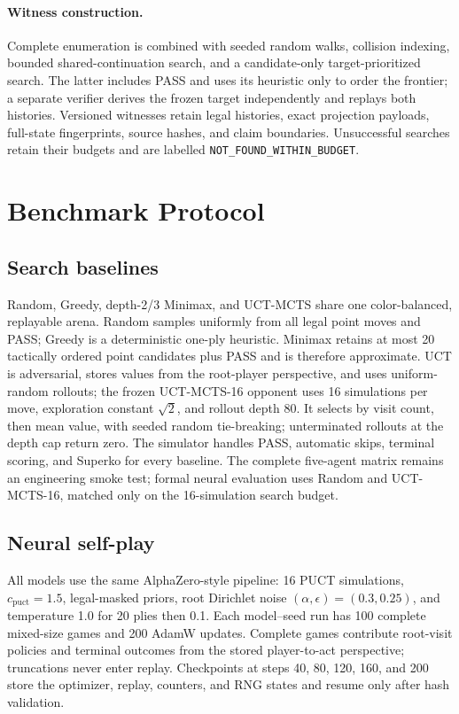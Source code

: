 \documentclass{article}
\begin{document}
\paragraph{Witness construction.}
Complete enumeration is combined with seeded random walks, collision indexing,
bounded shared-continuation search, and a candidate-only target-prioritized
search. The latter includes PASS and uses its heuristic only to order the
frontier; a separate verifier derives the frozen target independently and
replays both histories. Versioned witnesses retain legal histories, exact
projection payloads, full-state fingerprints, source hashes, and claim
boundaries. Unsuccessful searches retain their budgets and are labelled
\texttt{NOT\_FOUND\_WITHIN\_BUDGET}.

\section{Benchmark Protocol}
\label{sec:protocol}

\subsection{Search baselines}

Random, Greedy, depth-2/3 Minimax, and UCT-MCTS share one color-balanced,
replayable arena. Random samples uniformly from all legal point moves and PASS;
Greedy is a deterministic one-ply heuristic. Minimax retains at most 20
tactically ordered point candidates plus PASS and is therefore approximate.
UCT is adversarial, stores values from the root-player perspective, and uses
uniform-random rollouts; the frozen UCT-MCTS-16 opponent uses 16 simulations
per move, exploration constant $\sqrt{2}$, and rollout depth 80. It selects by
visit count, then mean value, with seeded random tie-breaking; unterminated
rollouts at the depth cap return zero. The simulator handles PASS, automatic
skips, terminal scoring, and Superko for every baseline. The complete
five-agent matrix remains an engineering smoke test; formal neural evaluation
uses Random and UCT-MCTS-16, matched only on the 16-simulation search budget.

\subsection{Neural self-play}

All models use the same AlphaZero-style pipeline: 16 PUCT simulations,
$c_{\mathrm{puct}}=1.5$, legal-masked priors, root Dirichlet noise
$(\alpha,\epsilon)=(0.3,0.25)$, and temperature 1.0 for 20 plies then 0.1.
Each model--seed run has 100 complete mixed-size games and 200 AdamW updates.
Complete games contribute root-visit policies and terminal outcomes from the
stored player-to-act perspective; truncations never enter replay. Checkpoints
at steps 40, 80, 120, 160, and 200 store the optimizer, replay, counters, and
RNG states and resume only after hash validation.
\end{document}
